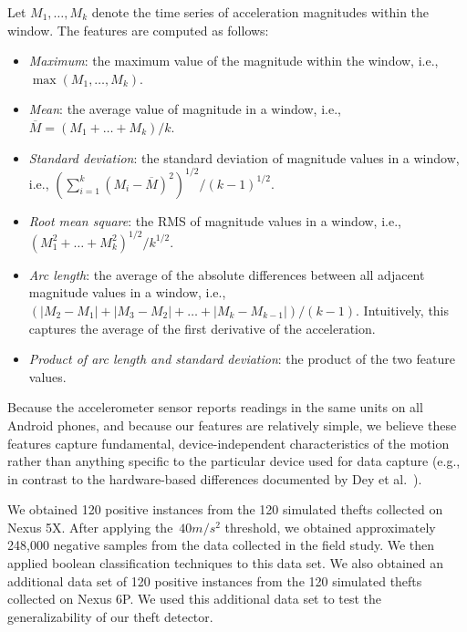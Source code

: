 Let $M_1,\dots,M_k$ denote the time series of acceleration magnitudes within the window.
The features are computed as follows:
\begin{itemize}
\item \emph{Maximum}: the maximum value of the magnitude within the window, i.e., $\max(M_1,\dots,M_k)$.
\item \emph{Mean}: the average value of magnitude in a window, i.e., $\overline{M}=(M_1+\dots + M_k)/k$.
\item \emph{Standard deviation}: the standard deviation of magnitude values in a window, i.e., $(\sum_{i=1}^{k}(M_i-\overline{M})^2)^{1/2}/(k-1)^{1/2}$.
\item \emph{Root mean square}: the RMS of magnitude values in a window, i.e., $(M_1^2 + \dots + M_k^2)^{1/2}/k^{1/2}$.
\item \emph{Arc length}: the average of the absolute differences between all adjacent magnitude values in a window, i.e., $(|M_2-M_1| + |M_3-M_2| + \dots + |M_k-M_{k-1}|)/(k-1)$.
Intuitively, this captures the average of the first derivative of the acceleration.
\item \emph{Product of arc length and standard deviation}: the product of the two feature values.
\end{itemize}

Because the accelerometer sensor reports readings in the same units on all Android phones, and because our features are relatively simple, we believe these features capture fundamental, device-independent characteristics of the motion rather than anything specific to the particular device used for data capture (e.g., in contrast to the hardware-based differences documented by Dey et al.~\cite{Dey2014}).

We obtained 120 positive instances from the 120 simulated thefts collected on Nexus 5X.
After applying the~$40 m/s^2$ threshold, we obtained approximately 248,000 negative samples from the data collected in the field study.
We then applied boolean classification techniques to this data set.
We also obtained an additional data set of 120 positive instances from the 120 simulated thefts collected on Nexus 6P.
We used this additional data set to test the generalizability of our theft detector.



